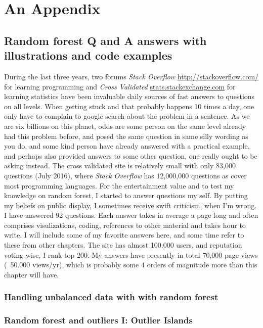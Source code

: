 \chapter{An Appendix}


\section{Random forest Q and A answers with illustrations and code examples}

During the last three years, two forums \textit{Stack Overflow} \url{http://stackoverflow.com/} for learning programming and \textit{Cross Validated} \url{stats.stackexchange.com} for learning statistics have been invaluable daily sources of fast answers to questions on all levels. When getting stuck and that probably happens 10 times a day, one only have to complain to google search about the problem in a sentence. As we are six billions on this planet, odds are some person on the same level already had this problem before, and posed the same question in same silly wording as you do, and some kind person have already answered with a practical example, and perhaps also provided answers to some other question, one really ought to be asking instead. The cross validated site is relatively small with only 83,000 questions (July 2016), where \textit{Stack Overflow} has 12,000,000 questions as cover most programming languages. For the entertainment value and to test my knowledge on random forest, I started to answer questions my self. By putting my beliefs on public display, I sometimes receive swift criticism, when I'm wrong. I have answered 92 questions. Each answer takes in average  a page long and often comprises visulizations, coding, references to other material and takes hour to write. I will include some of my favorite answers here, and some time refer to these from other chapters. The site has almost 100.000 users, and reputation voting wise, I rank top 200. My answers have presently in total 70,000 page views (~50.000 views/yr), which is probably some 4 orders of magnitude more than this chapter will have.


\subsection{Handling unbalanced data with with random forest}



\subsection{Random forest and outliers I: Outlier Islands}



